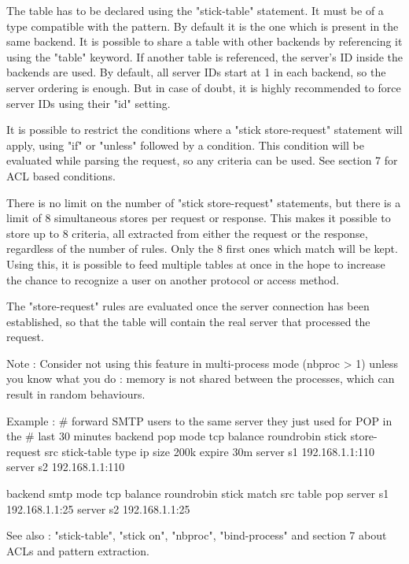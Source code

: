   The table has to be declared using the "stick-table" statement. It must be of
  a type compatible with the pattern. By default it is the one which is present
  in the same backend. It is possible to share a table with other backends by
  referencing it using the "table" keyword. If another table is referenced,
  the server's ID inside the backends are used. By default, all server IDs
  start at 1 in each backend, so the server ordering is enough. But in case of
  doubt, it is highly recommended to force server IDs using their "id" setting.

  It is possible to restrict the conditions where a "stick store-request"
  statement will apply, using "if" or "unless" followed by a condition. This
  condition will be evaluated while parsing the request, so any criteria can be
  used. See section 7 for ACL based conditions.

  There is no limit on the number of "stick store-request" statements, but
  there is a limit of 8 simultaneous stores per request or response. This
  makes it possible to store up to 8 criteria, all extracted from either the
  request or the response, regardless of the number of rules. Only the 8 first
  ones which match will be kept. Using this, it is possible to feed multiple
  tables at once in the hope to increase the chance to recognize a user on
  another protocol or access method.

  The "store-request" rules are evaluated once the server connection has been
  established, so that the table will contain the real server that processed
  the request.

  Note : Consider not using this feature in multi-process mode (nbproc > 1)
         unless you know what you do : memory is not shared between the
         processes, which can result in random behaviours.

  Example :
    # forward SMTP users to the same server they just used for POP in the
    # last 30 minutes
    backend pop
        mode tcp
        balance roundrobin
        stick store-request src
        stick-table type ip size 200k expire 30m
        server s1 192.168.1.1:110
        server s2 192.168.1.1:110

    backend smtp
        mode tcp
        balance roundrobin
        stick match src table pop
        server s1 192.168.1.1:25
        server s2 192.168.1.1:25

  See also : "stick-table", "stick on", "nbproc", "bind-process" and section 7
             about ACLs and pattern extraction.



